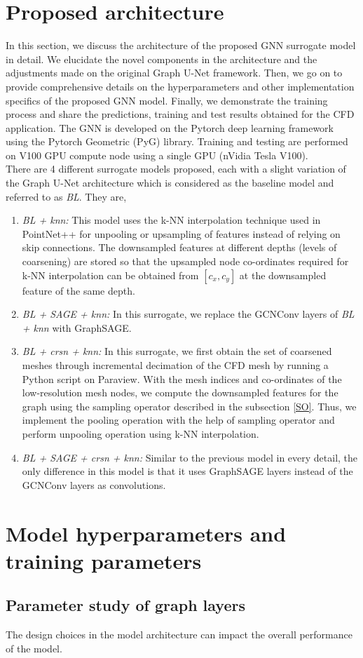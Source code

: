\section{Proposed architecture}
In this section, we discuss the architecture of the proposed GNN surrogate model in detail. We elucidate the novel components in the architecture and the adjustments made on the original Graph U-Net framework. Then, we go on to provide comprehensive details on the hyperparameters and other implementation specifics of the proposed GNN model. Finally, we demonstrate the training process and share the predictions, training and test results obtained for the CFD application. The GNN is developed on the Pytorch deep learning framework using the Pytorch Geometric (PyG) library. Training and testing are performed on V100 GPU compute node using a single GPU (nVidia Tesla V100).\\
There are 4 different surrogate models proposed, each with a slight variation of the Graph U-Net architecture which is considered as the baseline model and referred to as \textit{BL}. They are, 
\begin{enumerate}
    \item \textit{BL + knn:} This model uses the k-NN interpolation technique used in PointNet++ \cite{pnpp} for unpooling or upsampling of features instead of relying on skip connections. The downsampled features at different depths (levels of coarsening) are stored so that the upsampled node co-ordinates required for k-NN interpolation can be obtained from $[c_{x}, c_{y}]$ at the downsampled feature of the same depth.
    \item \textit{BL + SAGE + knn:} In this surrogate, we replace the GCNConv layers of \textit{BL + knn} with GraphSAGE. 
    \item \textit{BL + crsn + knn:} In this surrogate, we first obtain the set of coarsened meshes through incremental decimation of the CFD mesh by running a Python script on Paraview. With the mesh indices and co-ordinates of the low-resolution mesh nodes, we compute the downsampled features for the graph using the sampling operator described in the subsection \ref{SO}. Thus, we implement the pooling operation with the help of sampling operator and perform unpooling operation using k-NN interpolation. 
    \item \textit{BL + SAGE + crsn + knn:} Similar to the previous model in every detail, the only difference in this model is that it uses GraphSAGE layers instead of the GCNConv layers as convolutions.
\end{enumerate}
\section{Model hyperparameters and training parameters}

\subsection{Parameter study of graph layers}
The design choices in the model architecture can impact the overall performance of the model. 
